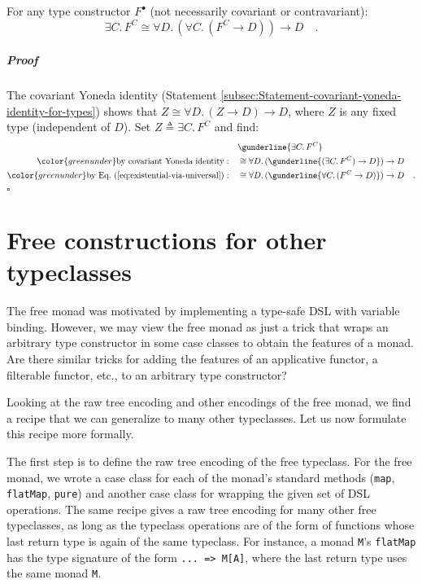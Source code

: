 For any type constructor $F^{\bullet}$ (not necessarily covariant
or contravariant):
\begin{equation}
\exists C.\,F^{C}\cong\forall D.\,(\forall C.\,(F^{C}\rightarrow D))\rightarrow D\quad.\label{eq:existential-via-universal-Yoneda}
\end{equation}


\subparagraph{Proof}

The covariant Yoneda identity (Statement \ref{subsec:Statement-covariant-yoneda-identity-for-types})
shows that $Z\cong\forall D.\,(Z\rightarrow D)\rightarrow D$, where
$Z$ is any fixed type (independent of $D$). Set $Z\triangleq\exists C.\,F^{C}$
and find:
\begin{align*}
 & \gunderline{\exists C.\,F^{C}}\\
{\color{greenunder}\text{by covariant Yoneda identity}:}\quad & \cong\forall D.\,(\gunderline{(\exists C.\,F^{C})\rightarrow D})\rightarrow D\\
{\color{greenunder}\text{by Eq.~(\ref{eq:existential-via-universal})}:}\quad & \cong\forall D.\,(\gunderline{\forall C.\,(F^{C}\rightarrow D)})\rightarrow D\quad.
\end{align*}
$\square$

\section{Free constructions for other typeclasses}

The free monad was motivated by implementing a type-safe DSL with
variable binding. However, we may view the free monad as just a trick
that wraps an arbitrary type constructor in some case classes to obtain
the features of a monad. Are there similar tricks for adding the features
of an applicative functor, a filterable functor, etc., to an arbitrary
type constructor? 

Looking at the raw tree encoding and other encodings of the free monad,
we find a recipe that we can generalize to many other typeclasses.
Let us now formulate this recipe more formally.

The first step is to define the raw tree encoding of the free typeclass.
For the free monad, we wrote a case class for each of the monad\textsf{'}s
standard methods (\lstinline!map!,
\lstinline!flatMap!, \lstinline!pure!)
and another case class for wrapping the given set of DSL operations.
The same recipe gives a raw tree encoding for many other free typeclasses,
as long as the typeclass operations are of the form of functions whose
last return type is again of the same typeclass. For instance, a monad
\lstinline!M!\textsf{'}s \lstinline!flatMap!
has the type signature of the form \lstinline!... => M[A]!,
where the last return type uses the same monad \lstinline!M!.

